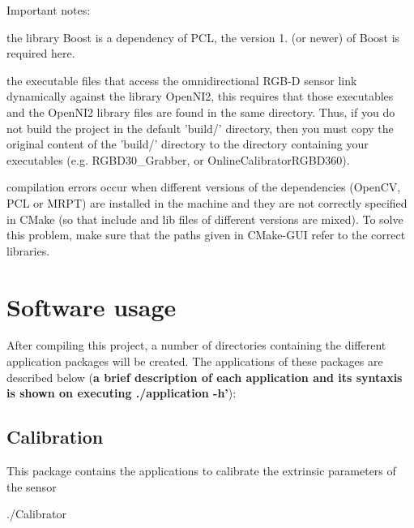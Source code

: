 Important notes\-:
\begin{DoxyItemize}
\item the library Boost is a dependency of P\-C\-L, the version 1. (or newer) of Boost is required here.
\item the executable files that access the omnidirectional R\-G\-B-\/\-D sensor link dynamically against the library Open\-N\-I2, this requires that those executables and the Open\-N\-I2 library files are found in the same directory. Thus, if you do not build the project in the default 'build/' directory, then you must copy the original content of the 'build/' directory to the directory containing your executables (e.\-g. R\-G\-B\-D30\-\_\-\-Grabber, or Online\-Calibrator\-R\-G\-B\-D360).
\item compilation errors occur when different versions of the dependencies (Open\-C\-V, P\-C\-L or M\-R\-P\-T) are installed in the machine and they are not correctly specified in C\-Make (so that include and lib files of different versions are mixed). To solve this problem, make sure that the paths given in C\-Make-\/\-G\-U\-I refer to the correct libraries.
\end{DoxyItemize}\hypertarget{index_usage_sec}{}\section{Software usage}\label{index_usage_sec}
After compiling this project, a number of directories containing the different application packages will be created. The applications of these packages are described below ({\bfseries a brief description of each application and its syntaxis is shown on executing ./application -\/h'})\-: \hypertarget{index_Calibration}{}\subsection{Calibration}\label{index_Calibration}
This package contains the applications to calibrate the extrinsic parameters of the sensor

\begin{DoxyVerb}./Calibrator
\end{DoxyVerb}


